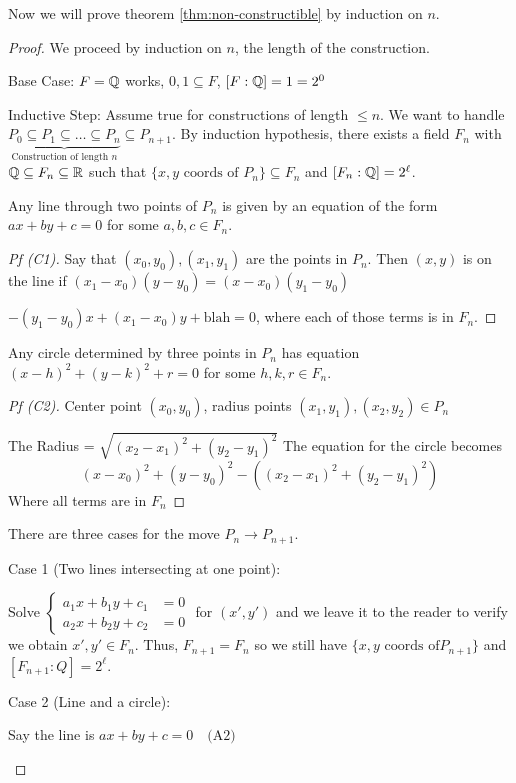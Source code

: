 \documentclass[notes.tex]{subfiles}
\begin{document}

Now we will prove theorem \ref{thm:non-constructible} by induction on $n$.
\begin{proof}
	We proceed by induction on $n$, the length of the construction.

	Base Case: $F = \mathbb{Q}$ works, ${0, 1}\subseteq F$, $[F:\mathbb{Q}] = 1 = 2^0$ \checkmark

	Inductive Step: Assume true for constructions of length $\le n$.  We want to handle $\underbrace{P_0\subseteq P_1\subseteq \ldots \subseteq P_n}_{\text{Construction of length }n}\subseteq P_{n+1}$.
	By induction hypothesis, there exists a field $F_n$ with $\mathbb{Q}\subseteq F_n\subseteq \mathbb{R}$ such that $\{x, y \text{ coords of } P_n\}\subseteq F_n$ and $[F_n:\mathbb{Q}] = 2^\ell$.

	\begin{claim}[1]
		Any line through two points of $P_n$ is given by an equation of the form $ax+by+c = 0$ for some $a, b, c\in F_n$.
	\end{claim}
	\begin{proof}[Pf (C1)]
		Say that $(x_0, y_0), (x_1, y_1)$ are the points in $P_n$.
		Then $(x, y)$ is on the line if $(x_1-x_0)(y-y_0) = (x-x_0)(y_1-y_0)$

		$-(y_1 - y_0)x + (x_1 - x_0)y + \text{blah} = 0$, where each of those terms is in $F_n$.
	\end{proof}
	\begin{claim}[2]
		Any circle determined by three points in $P_n$ has equation $(x-h)^2 + (y-k)^2 + r = 0$ for some $h, k , r\in F_n$.
	\end{claim}
	\begin{proof}[Pf (C2)]
		Center point $(x_0, y_0)$, radius points $(x_1, y_1), (x_2, y_2)\in P_n$

		The Radius = $\sqrt{(x_2-x_1)^2 + (y_2-y_1)^2}$
		The equation for the circle becomes 
		\[
			(x-x_0)^2 + (y-y_0)^2 - ((x_2 - x_1)^2  + (y_2-y_1)^2)
		\]
		Where all terms are in $F_n$
	\end{proof}
	There are three cases for the move $P_n\to P_{n+1}$.

	Case 1 (Two lines intersecting at one point):
	\begin{tabin}
		Solve $\begin{cases}
			a_1x + b_1y + c_1 &= 0\\
			a_2x + b_2y + c_2 &= 0
		\end{cases}$ for $(x', y')$ and we leave it to the reader to verify we obtain $x', y' \in F_n$. Thus, $F_{n+1} = F_n$ so we still have $\{x, y \text{ coords of} P_{n+1}\}$ and $[F_{n+1}:Q] = 2^\ell$.
	\end{tabin}
	Case 2 (Line and a circle):
	\begin{tabin}
		Say the line is 
		$ax+by + c = 0\quad\text{(A2)}$ 


\end{tabin}
\end{proof}
\end{document}
